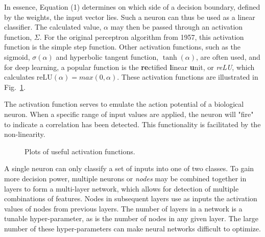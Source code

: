 \documentclass{article}
\begin{document}
In essence, Equation (1) determines on which side of a decision boundary, defined by the weights, the input vector lies.  Such a neuron can thus be used as a linear classifier.  
The calculated value, $\alpha$ may then be passed through an activation function, $\Sigma$.  
For the original perceptron algorithm from 1957, this activation function is the simple step function. 
Other activation functions, such as the sigmoid, $\sigma(\alpha)$ and hyperbolic tangent function, $\tanh(\alpha)$, are often used, and for deep learning, a popular function is the \textbf{re}ctified \textbf{l}inear \textbf{u}nit, or \textit{reLU}, which calculates $\mathrm{reLU}(\alpha) = max(0, \alpha)$.
These activation functions are illustrated in Fig.~\ref{fig:plots}. 

The activation function serves to emulate the action potential of a biological neuron. When a specific range of input values are applied, the neuron will "fire" to indicate a correlation has been detected. This functionality is facilitated by the non-linearity.

\begin{figure}[h!]
\centering
{}
\caption{Plots of useful activation functions.}
\label{fig:plots}
\end{figure}

A single neuron can only classify a set of inputs into one of two classes.  To gain more decision power, multiple neurons or \textit{nodes} may be combined together in layers to form a multi-layer network, which allows for detection of multiple combinations of features.  Nodes in subsequent layers use as inputs the activation values of nodes from previous layers. The number of layers in a network is a tunable hyper-parameter, as is the number of nodes in any given layer. The large number of these hyper-parameters can make neural networks difficult to optimize.
\end{document}
